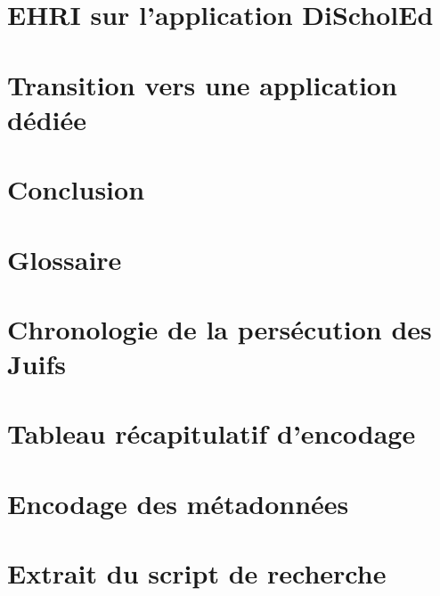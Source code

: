 \documentclass[a4paper, 12pt, twoside]{book}
\begin{document}
    \chapter{EHRI sur l'application DiScholEd}
    
    \chapter{Transition vers une application dédiée}
    

    \chapter*{Conclusion}
    

    \appendix
    \chapter{Glossaire}
    
    \chapter{Chronologie de la persécution des Juifs}
    
    \chapter{Tableau récapitulatif d'encodage}
    
    \chapter{Encodage des métadonnées}
    
    \chapter{Extrait du script de recherche}
    

    \backmatter
	
    \listoffigures
    
    \tableofcontents
    
\end{document}
